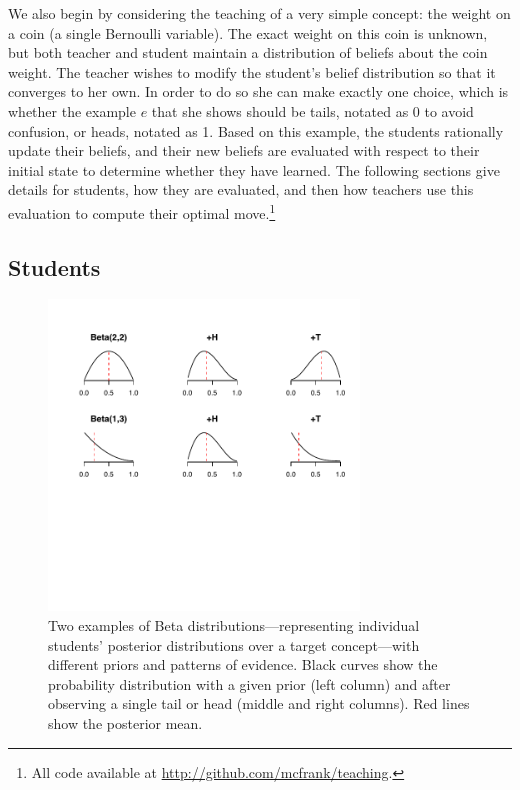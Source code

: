 \documentclass[10pt,letterpaper]{article}
\begin{document}
We also begin by considering the teaching of a very simple concept: the weight on a coin (a single Bernoulli variable). The exact weight on this coin is unknown, but both teacher and student maintain a distribution of beliefs about the coin weight. The teacher wishes to modify the student's belief distribution so that it converges to her own. In order to do so she can make exactly one choice, which is whether the example $e$ that she shows should be tails, notated as 0 to avoid confusion, or heads, notated as 1. Based on this example, the students rationally update their beliefs, and their new beliefs are evaluated with respect to their initial state to determine whether they have learned. The following sections give details for students, how they are evaluated, and then how teachers use this evaluation to compute their optimal move.\footnote{All code available at \url{http://github.com/mcfrank/teaching}.}

\subsection{Students}

\begin{figure}[t]
\begin{center}
\includegraphics[width=3.25in]{figures/students2.pdf}
\end{center}
\caption{\label{fig:students} Two examples of Beta distributions---representing individual students' posterior distributions over a target concept---with different priors and patterns of evidence. Black curves show the probability distribution with a given prior (left column) and after observing a single tail or head (middle and right columns). Red lines show the posterior mean.}
\end{figure}
\end{document}
